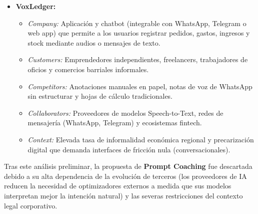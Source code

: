 \begin{itemize}
    \begin{itemize}
        \item \textit{Company:} Plataforma digital SaaS (Software as a Service) orientada a la gestión de consorcios. Su objetivo es modernizar la administración tradicional mediante la digitalización de procesos y la incorporación de herramientas de análisis inteligente.
        \item \textit{Customers:} Administradores de consorcios tradicionales y prestadores de servicios de mantenimiento.
        \item \textit{Competitors:} Plataformas establecidas (ConsorcioAbierto, Octopus Proptech), planillas de Excel y redes informales de contacto.
        \item \textit{Collaborators:} Proveedores de infraestructura en la nube, procesadores de pago y profesionales matriculados (electricistas, plomeros).
        \item \textit{Context:} Alta inflación y necesidad urgente de los consorcios por auditar sobrecostos, contrarrestada por una fuerte resistencia cultural y burocrática al cambio tecnológico.
    \end{itemize}
    \item \textbf{VoxLedger:}
    \begin{itemize}
        \item \textit{Company:} Aplicación y chatbot (integrable con WhatsApp, Telegram o web app) que permite a los usuarios registrar pedidos, gastos, ingresos y stock mediante audios o mensajes de texto.
        \item \textit{Customers:} Emprendedores independientes, freelancers, trabajadores de oficios y comercios barriales informales.
        \item \textit{Competitors:} Anotaciones manuales en papel, notas de voz de WhatsApp sin estructurar y hojas de cálculo tradicionales.
        \item \textit{Collaborators:} Proveedores de modelos Speech-to-Text, redes de mensajería (WhatsApp, Telegram) y ecosistemas fintech.
        \item \textit{Context:} Elevada tasa de informalidad económica regional y precarización digital que demanda interfaces de fricción nula (conversacionales).
    \end{itemize}
\end{itemize}
Tras este análisis preliminar, la propuesta de \textbf{Prompt Coaching} fue descartada debido a su alta dependencia de la evolución de terceros (los proveedores de IA reducen la necesidad de optimizadores externos a medida que sus modelos interpretan mejor la intención natural) y las severas restricciones del contexto legal corporativo.

